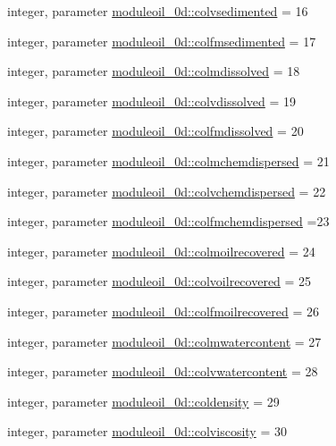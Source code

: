 \begin{DoxyCompactItemize}
integer, parameter \mbox{\hyperlink{namespacemoduleoil__0d_abb7a1f5cc43537d0a980d6cf97d03dba}{moduleoil\+\_\+0d\+::colvsedimented}} = 16
\item 
integer, parameter \mbox{\hyperlink{namespacemoduleoil__0d_a46001cfe6074a6d45e98b7d7b0f7c28f}{moduleoil\+\_\+0d\+::colfmsedimented}} = 17
\item 
integer, parameter \mbox{\hyperlink{namespacemoduleoil__0d_a6251e1255d8b28af10a0e17065f99554}{moduleoil\+\_\+0d\+::colmdissolved}} = 18
\item 
integer, parameter \mbox{\hyperlink{namespacemoduleoil__0d_aa3385ce40df10f7199f0aa7da8ee08fa}{moduleoil\+\_\+0d\+::colvdissolved}} = 19
\item 
integer, parameter \mbox{\hyperlink{namespacemoduleoil__0d_aa98b02cf8b1ea70db35db2f282bac356}{moduleoil\+\_\+0d\+::colfmdissolved}} = 20
\item 
integer, parameter \mbox{\hyperlink{namespacemoduleoil__0d_a46bac6314b70090798aab8e9b1c3e298}{moduleoil\+\_\+0d\+::colmchemdispersed}} = 21
\item 
integer, parameter \mbox{\hyperlink{namespacemoduleoil__0d_acee45b3e3f1d68d284e4051d62c83c4f}{moduleoil\+\_\+0d\+::colvchemdispersed}} = 22
\item 
integer, parameter \mbox{\hyperlink{namespacemoduleoil__0d_aa8c7e330749c731e093773786b7e3021}{moduleoil\+\_\+0d\+::colfmchemdispersed}} =23
\item 
integer, parameter \mbox{\hyperlink{namespacemoduleoil__0d_a0b2dac08c7702f692a25ec3f55eb9963}{moduleoil\+\_\+0d\+::colmoilrecovered}} = 24
\item 
integer, parameter \mbox{\hyperlink{namespacemoduleoil__0d_a0558e019cc320bee4dcc2a00dc0832a6}{moduleoil\+\_\+0d\+::colvoilrecovered}} = 25
\item 
integer, parameter \mbox{\hyperlink{namespacemoduleoil__0d_aa759460c1d7d6e404f428567a47a779c}{moduleoil\+\_\+0d\+::colfmoilrecovered}} = 26
\item 
integer, parameter \mbox{\hyperlink{namespacemoduleoil__0d_ad2836f14c2c7a38c29d1e0c90cd03bc8}{moduleoil\+\_\+0d\+::colmwatercontent}} = 27
\item 
integer, parameter \mbox{\hyperlink{namespacemoduleoil__0d_ae06b335e38dbdb67bb4d26f499db8116}{moduleoil\+\_\+0d\+::colvwatercontent}} = 28
\item 
integer, parameter \mbox{\hyperlink{namespacemoduleoil__0d_acb0f41d57655acbdec9be151e087c898}{moduleoil\+\_\+0d\+::coldensity}} = 29
\item 
integer, parameter \mbox{\hyperlink{namespacemoduleoil__0d_aa9445f51edab9768043babba745ed59e}{moduleoil\+\_\+0d\+::colviscosity}} = 30

\end{DoxyCompactItemize}

